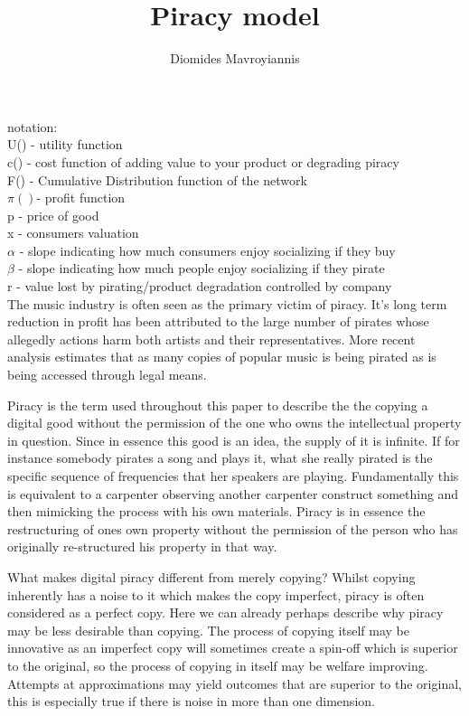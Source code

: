 \documentclass{article}
\begin{document}
\title{Piracy model}
\author{Diomides Mavroyiannis}

\maketitle

notation: \\
U() - utility function \\
c() - cost function of adding value to your product or degrading piracy \\
F() - Cumulative Distribution function of the network \\
$\pi()$- profit function \\
p - price of good \\
x - consumers valuation \\
$\alpha$ - slope indicating how much consumers enjoy socializing if they buy\\
$\beta$ - slope indicating how much people enjoy socializing if they pirate \\
r - value lost by pirating/product degradation controlled by company \\ 

The music industry is often seen as the primary victim of piracy. It's long term reduction in profit has been attributed to the large number of pirates whose allegedly actions harm both artists and their representatives\citep{B03}. More recent analysis estimates that as many copies of popular music is being pirated as is being accessed through legal means\citep{O15}.

Piracy is the term used throughout this paper to describe the the copying a digital good without the permission of the one who owns the intellectual property in question. Since in essence this good is an idea, the supply of it is infinite. If for instance somebody pirates a song and plays it, what she really pirated is the specific sequence of frequencies that her speakers are playing. Fundamentally this is equivalent to a carpenter observing another carpenter construct something and then mimicking the process with his own materials. Piracy is in essence the restructuring of ones  own property without the permission of the person who has originally re-structured his property in that way. 

What makes digital piracy different from merely copying? Whilst copying inherently has a noise to it which makes the copy imperfect, piracy is often considered as a perfect copy. Here we can already perhaps describe why piracy may be less desirable than copying. The process of copying itself may be innovative as an imperfect copy will sometimes create a spin-off which is superior to the original, so the process of copying in itself may be welfare improving. Attempts at approximations may yield outcomes that are superior to the original, this is especially true if there is noise in more than one dimension. 
\end{document}
